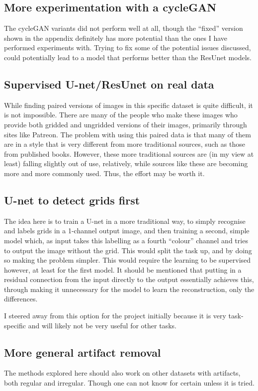 \subsection{More experimentation with a cycleGAN}
The cycleGAN variants did not perform well at all, though the ``fixed'' version shown in the appendix definitely has more potential than the ones I have performed experiments with. Trying to fix some of the potential issues discussed, could potentially lead to a model that performs better than the ResUnet models.

\subsection{Supervised U-net/ResUnet on real data}
While finding paired versions of images in this specific dataset is quite difficult, it is not impossible. There are many of the people who make these images who provide both gridded and ungridded versions of their images, primarily through sites like Patreon. The problem with using this paired data is that many of them are in a style that is very different from more traditional sources, such as those from published books. However, these more traditional sources are (in my view at least) falling slightly out of use, relatively, while sources like these are becoming more and more commonly used. Thus, the effort may be worth it.

\subsection{U-net to detect grids first}
The idea here is to train a U-net in a more traditional way, to simply recognise and labels grids in a 1-channel output image, and then training a second, simple model which, as input takes this labelling as a fourth ``colour'' channel and tries to output the image without the grid. This would split the task up, and by doing so making the problem simpler. This would require the learning to be supervised however, at least for the first model. It should be mentioned that putting in a residual connection from the input directly to the output essentially achieves this, through making it unnecessary for the model to learn the reconstruction, only the differences.

I steered away from this option for the project initially because it is very task-specific and will likely not be very useful for other tasks.

\subsection{More general artifact removal}
The methods explored here should also work on other datasets with artifacts, both regular and irregular. Though one can not know for certain unless it is tried.
